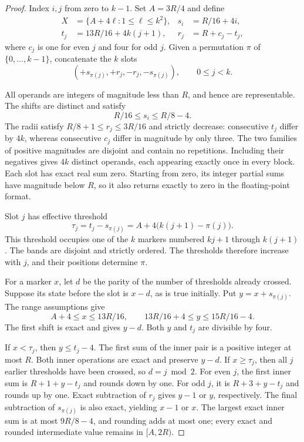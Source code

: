 \documentclass[11pt,reqno]{amsart}
\theoremstyle{definition}
\theoremstyle{remark}
\numberwithin{equation}{section}
\begin{document}
\begin{proof}
Index $i,j$ from zero to $k-1$. Set $A=3R/4$ and define
\begin{equation}
\label{eq:permutation-parameters}
\begin{aligned}
 X&=\{A+4\ell:1\leq\ell\leq k^2\},
 &s_i&=R/16+4i,\\
 t_j&=13R/16+4k(j+1),
 &r_j&=R+c_j-t_j,
\end{aligned}
\end{equation}
where $c_j$ is one for even $j$ and four for odd $j$. Given a
permutation $\pi$ of $\{0,\ldots,k-1\}$, concatenate the $k$ slots
\begin{equation}
\label{eq:permutation-slot}
 (+s_{\pi(j)},+r_j,-r_j,-s_{\pi(j)}),\qquad 0\leq j<k.
\end{equation}

All operands are integers of magnitude less than $R$, and hence are
representable. The shifts are distinct and satisfy
\[
 R/16\leq s_i\leq R/8-4.
\]
The radii satisfy $R/8+1\leq r_j\leq 3R/16$ and strictly decrease:
consecutive $t_j$ differ by $4k$, whereas consecutive $c_j$ differ in
magnitude by only three. The two families of positive magnitudes are
disjoint and contain no repetitions. Including their negatives gives
$4k$ distinct operands, each appearing exactly once in every block.
Each slot has exact real sum zero. Starting from zero, its integer
partial sums have magnitude below $R$, so it also returns exactly to
zero in the floating-point format.

Slot $j$ has effective threshold
\begin{equation}
\label{eq:effective-threshold}
 \tau_j=t_j-s_{\pi(j)}=A+4\bigl(k(j+1)-\pi(j)\bigr).
\end{equation}
This threshold occupies one of the $k$ markers numbered $kj+1$ through
$k(j+1)$. The bands are disjoint and strictly ordered. The thresholds
therefore increase with $j$, and their positions determine $\pi$.

For a marker $x$, let $d$ be the parity of the number of thresholds
already crossed. Suppose its state before the slot is $x-d$, as is
true initially. Put $y=x+s_{\pi(j)}$. The range assumptions give
\[
 A+4\leq x\leq 13R/16,
 \qquad 13R/16+4\leq y\leq 15R/16-4.
\]
The first shift is exact and gives $y-d$. Both $y$ and $t_j$ are
divisible by four.

If $x<\tau_j$, then $y\leq t_j-4$. The first sum of the inner pair
is a positive integer at most $R$. Both inner operations are exact
and preserve $y-d$. If $x\geq\tau_j$, then all $j$ earlier thresholds
have been crossed, so $d=j\bmod 2$. For even $j$, the first inner
sum is $R+1+y-t_j$ and rounds down by one. For odd $j$, it is
$R+3+y-t_j$ and rounds up by one. Exact subtraction of $r_j$ gives
$y-1$ or $y$, respectively. The final subtraction of $s_{\pi(j)}$
is also exact, yielding $x-1$ or $x$. The largest exact inner sum is
at most $9R/8-4$, and rounding adds at most one; every exact and
rounded intermediate value remains in $[A,2R)$.


\end{proof}
\end{document}
